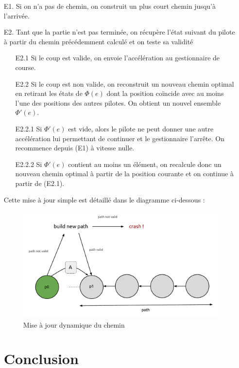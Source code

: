 \documentclass[a4paper,10pt]{article}
\begin{document}
\begin{itemize}
 \item [E1.] Si on n'a pas de chemin, on construit un plus court chemin jusqu'à l'arrivée.
 \item[E2.] Tant que la partie n'est pas terminée, on récupère l'état suivant du pilote à partir du chemin précédemment calculé et on teste sa validité
 \begin{itemize}
  \item [E2.1] Si le coup est valide, on envoie l'accélération au gestionnaire de course.
  \item[E2.2] Si le coup est non valide, on reconstruit un nouveau chemin optimal en retirant les états de $\Phi(e)$ dont la position coïncide avec au moins l'une des positions des autres pilotes. 
    On obtient un nouvel ensemble $\Phi'(e)$.
      \item[E2.2.1] Si $\Phi'(e)$ est vide, alors le pilote ne peut donner une autre accélération lui permettant de continuer et le gestionnaire l'arrête. On recommence depuis (E1) à vitesse nulle.
      \item[E2.2.2] Si $\Phi'(e)$ contient au moins un élément, on recalcule donc un nouveau chemin optimal à partir de la position courante et on continue à partir de (E2.1).
 \end{itemize}
 
Cette mise à jour simple est détaillé dans le diagramme ci-dessous :

\begin{figure}[!h]
\centering
\includegraphics[scale=0.6]{game.pdf}
\caption{Mise à jour dynamique du chemin}
\end{figure}

\section{Conclusion}


\end{itemize}
\end{document}
